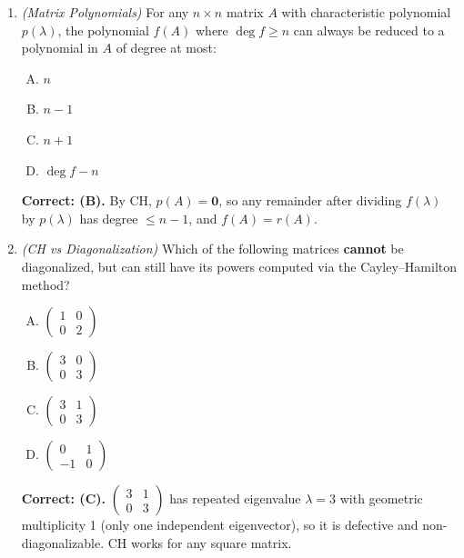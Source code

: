 \documentclass[12pt,a4paper]{article}
\begin{document}
\begin{enumerate}
  \item \textit{(Matrix Polynomials)} For any \(n \times n\) matrix \(A\) with characteristic polynomial \(p(\lambda)\), the polynomial \(f(A)\) where \(\deg f \geq n\) can always be reduced to a polynomial in \(A\) of degree at most:
    \begin{enumerate}[(A)]
      \item \(n\)
      \item \textbf{\(n-1\)}
      \item \(n+1\)
      \item \(\deg f - n\)
    \end{enumerate}
    \textbf{Correct: (B).} By CH, \(p(A) = \mathbf{0}\), so any remainder after dividing \(f(\lambda)\) by \(p(\lambda)\) has degree \(\leq n-1\), and \(f(A) = r(A)\).

  \item \textit{(CH vs Diagonalization)} Which of the following matrices \textbf{cannot} be diagonalized, but can still have its powers computed via the Cayley--Hamilton method?
    \begin{enumerate}[(A)]
      \item \(\begin{pmatrix}1&0\\0&2\end{pmatrix}\)
      \item \(\begin{pmatrix}3&0\\0&3\end{pmatrix}\)
      \item \textbf{\(\begin{pmatrix}3&1\\0&3\end{pmatrix}\)}
      \item \(\begin{pmatrix}0&1\\-1&0\end{pmatrix}\)
    \end{enumerate}
    \textbf{Correct: (C).} \(\begin{pmatrix}3&1\\0&3\end{pmatrix}\) has repeated eigenvalue \(\lambda=3\) with geometric multiplicity 1 (only one independent eigenvector), so it is defective and non-diagonalizable. CH works for any square matrix.


\end{enumerate}
\end{document}
